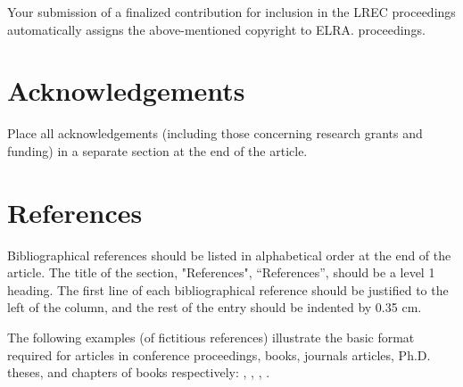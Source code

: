 \documentclass[10pt, a4paper]{article}
\begin{document}
Your submission of a finalized contribution for inclusion in the LREC proceedings automatically assigns the above-mentioned copyright to ELRA.
proceedings.

\section{Acknowledgements}

Place all acknowledgements (including those concerning research grants and funding) in a separate section at the end of the article.

\section{References}
Bibliographical references should be listed in alphabetical order at the end of the article. The title of the section, "References", ``References'', should be a level 1 heading. The first line of each bibliographical reference should be justified to the left of the column, and the rest of the entry should be indented by 0.35 cm.

The following examples (of fictitious references) illustrate the basic format required for articles in conference proceedings, books, journals articles, Ph.D. theses, and chapters of books respectively:
\cite{Martin-90},  \cite{Chercheur-94},  \cite{CastorPollux-92}  \cite{Zavatta-92},  \cite{Grandchercheur-83}.




\end{document}
